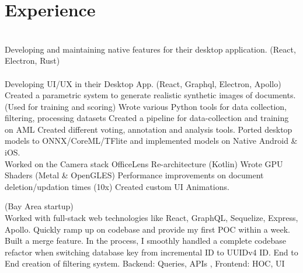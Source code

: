 \documentclass[]{deedy-resume-openfont}
\begin{document}
\begin{minipage}[t]{0.66\textwidth} 


\section{Experience}
\\
Developing and maintaining native features for their desktop application. (React, Electron, Rust)\\
\sectionsep
{}\\
Developing UI/UX in their Desktop App. (React, Graphql, Electron, Apollo)\\
\textbullet Created a parametric system to generate realistic synthetic images of documents. (Used for training and scoring)
\textbullet Wrote various Python tools for data collection, filtering, processing datasets \textbullet Created a pipeline for data-collection and training on AML \textbullet Created different voting, annotation and analysis tools.  \textbullet Ported desktop models to ONNX/CoreML/TFlite and implemented models on Native Android \& iOS. \\
\textbullet  Worked on the Camera stack \textbullet  OfficeLens Re-architecture (Kotlin) \textbullet  Wrote GPU Shaders (Metal \& OpenGLES) \textbullet  Performance improvements on document deletion/updation times (10x)
\textbullet Created custom UI Animations.
\sectionsep

 (Bay Area startup) \\
Worked with full-stack web technologies like React, GraphQL, Sequelize, Express, Apollo. \textbullet Quickly ramp up on codebase and provide my first POC within a week.
\textbullet Built a merge feature. In the process, I smoothly handled a complete codebase refactor when switching database key from incremental ID to UUIDv4 ID.
\textbullet End to End creation of filtering system. Backend: Queries, APIs , Frontend: HOC, UI


\end{minipage}
\end{document}
